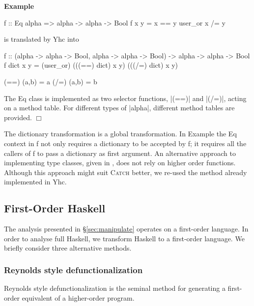 \documentclass[preprint]{sigplanconf}
\let\cite=\citep
\newcommand{\C}[1]{\textsf{#1}}
\newcommand{\catch}{\textsc{Catch}}
\newcounter{exmp}
\newcommand{\yesexample}{\addtocounter{exmp}{1}\addvspace{2mm}\noindent\textbf{Example \arabic{exmp}}}
\newcommand{\noexample}{\hfill$\Box$\par\addvspace{2mm}}
\newcommand{\lastexample}{\arabic{exmp}}
\newenvironment{example}{\yesexample}{\noexample}
\begin{document}
\begin{example}
\begin{code}
f :: Eq alpha => alpha -> alpha -> Bool
f x y = x == y user_or x /= y
\end{code}

\noindent is translated by Yhc into

\begin{code}
f :: (alpha -> alpha -> Bool, alpha -> alpha -> Bool) -> alpha -> alpha -> Bool
f dict x y = (user_or) (((==) dict) x y) (((/=) dict) x y)

(==) (a,b) = a
(/=) (a,b) = b
\end{code}

The \C{Eq} class is implemented as two selector functions, |(==)| and |(/=)|, acting on a method table. For different types of |alpha|, different method tables are provided.
\end{example}

The dictionary transformation is a global transformation. In Example \lastexample{} the \C{Eq} context in \C{f} not only requires a dictionary to be accepted by \C{f}; it requires all the callers of \C{f} to pass a dictionary as first argument. An alternative approach to implementing type classes, given in \cite{jones:dictionary_free}, does not rely on higher order functions. Although this approach might suit \catch{} better, we re-used the method already implemented in Yhc.

\subsection{First-Order Haskell}

The analysis presented in \S\ref{sec:manipulate} operates on a first-order language. In order to analyse full Haskell, we transform Haskell to a first-order language. We briefly consider three alternative methods.

\subsubsection{Reynolds style defunctionalization}

Reynolds style defunctionalization \citep{reynolds:defunc} is the seminal method for generating a first-order equivalent of a higher-order program.
\end{document}
